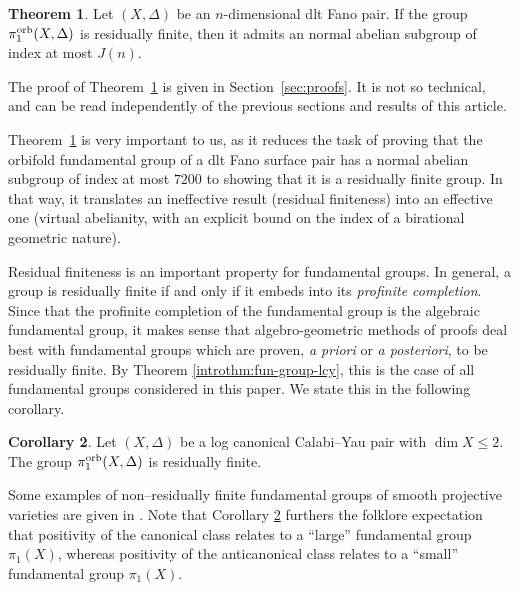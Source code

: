 \documentclass{amsart}
\theoremstyle{definition}
\newtheorem{alphtheorem}{Theorem}
\newtheorem{alphcor}[alphtheorem]{Corollary}
\theoremstyle{remark}
\numberwithin{equation}{section}
\begin{document}
\begin{alphtheorem}\label{introthm:Jordan-dlt-Fano}
Let $(X,\Delta)$ be an $n$-dimensional dlt Fano pair.
If the group $\pi_1^{\rm orb}(X,\Delta)$ is residually finite, then it admits an normal abelian subgroup of index at most $J(n)$.
\end{alphtheorem}

The proof of Theorem~\ref{introthm:Jordan-dlt-Fano} is given in Section~\ref{sec:proofs}. It is not so technical, and can be read independently of the previous sections and results of this article.

Theorem~\ref{introthm:Jordan-dlt-Fano} is very important to us, as it reduces the task 
of proving that the orbifold fundamental group of a dlt Fano surface pair has a normal abelian subgroup of index at most $7200$ to showing that it is a residually finite group. In that way, it translates an ineffective result (residual finiteness) into an effective one (virtual abelianity, with an explicit bound on the index of a birational geometric nature).

\medskip

Residual finiteness is an important property for fundamental groups. In general, a group is residually finite if and only if it embeds into its {\it profinite completion}. Since that the profinite completion of the fundamental group is the algebraic fundamental group, it makes sense that algebro-geometric methods of proofs deal best with fundamental groups which are proven, {\it a priori} or {\it a posteriori}, to be residually finite. By Theorem \ref{introthm:fun-group-lcy}, this is the case of all fundamental groups considered in this paper. We state this in the following corollary.

\begin{alphcor}\label{introcor1}
Let $(X,\Delta)$ be a log canonical Calabi--Yau pair with $\dim X \le 2$.
The group $\pi_1^{\rm orb}(X,\Delta)$ is residually finite.
\end{alphcor}

Some examples of non--residually finite fundamental groups of smooth projective varieties are given in \cite{Tol93}.
Note that Corollary \ref{introcor1} furthers the folklore expectation that positivity of the canonical class relates to a ``large'' fundamental group $\pi_1(X)$, whereas positivity of the anticanonical class relates to a ``small'' fundamental group $\pi_1(X)$.
\end{document}
